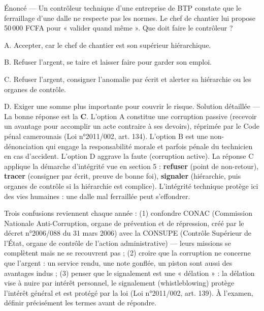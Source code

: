 \documentclass[11pt]{article}
\newcommand{\cle}[1]{{\popxbold\color{popdark}#1}}
\begin{document}
\begin{exoresolu}
Énoncé — Un contrôleur technique d'une entreprise de BTP constate que le ferraillage d'une dalle ne respecte pas les normes. Le chef de chantier lui propose 50\,000 FCFA pour « valider quand même ». Que doit faire le contrôleur ?\par
A. Accepter, car le chef de chantier est son supérieur hiérarchique.\par
B. Refuser l'argent, se taire et laisser faire pour garder son emploi.\par
C. Refuser l'argent, consigner l'anomalie par écrit et alerter sa hiérarchie ou les organes de contrôle.\par
D. Exiger une somme plus importante pour couvrir le risque.
\tcblower
Solution détaillée — La bonne réponse est la \textbf{C}. L'option A constitue une \cle{corruption passive} (recevoir un avantage pour accomplir un acte contraire à ses devoirs), réprimée par le Code pénal camerounais (Loi n°2011/002, art. 134). L'option B est une non-dénonciation qui engage la responsabilité morale et parfois pénale du technicien en cas d'accident. L'option D aggrave la faute (corruption active). La réponse C applique la démarche d'intégrité vue en section 5 : \textbf{refuser} (point de non-retour), \textbf{tracer} (consigner par écrit, preuve de bonne foi), \textbf{signaler} (hiérarchie, puis organes de contrôle si la hiérarchie est complice). L'intégrité technique protège ici des vies humaines : une dalle mal ferraillée peut s'effondrer.
\end{exoresolu}

\begin{attention}
Trois confusions reviennent chaque année : (1) confondre \cle{CONAC} (Commission Nationale Anti-Corruption, organe de prévention et de répression, créé par le décret n°2006/088 du 31 mars 2006) avec la \cle{CONSUPE} (Contrôle Supérieur de l'État, organe de contrôle de l'action administrative) — leurs missions se complètent mais ne se recouvrent pas ; (2) croire que la corruption ne concerne que l'argent : un service rendu, une note gonflée, un piston sont aussi des \cle{avantages indus} ; (3) penser que le signalement est une « délation » : la délation vise à nuire par intérêt personnel, le signalement (\cle{whistleblowing}) protège l'intérêt général et est protégé par la loi (Loi n°2011/002, art. 139). À l'examen, définir précisément les termes avant de répondre.
\end{attention}
\end{document}

